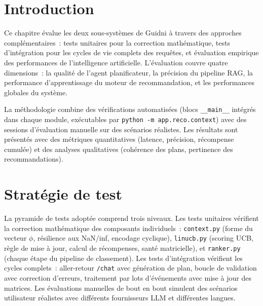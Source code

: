 
\section{Introduction}

Ce chapitre évalue les deux sous-systèmes de Guidni à travers des approches complémentaires~:
tests unitaires pour la correction mathématique, tests d'intégration pour les cycles de vie
complets des requêtes, et évaluation empirique des performances de l'intelligence artificielle.
L'évaluation couvre quatre dimensions~: la qualité de l'agent planificateur, la précision du
pipeline RAG, la performance d'apprentissage du moteur de recommandation, et les performances
globales du système.

La méthodologie combine des vérifications automatisées (blocs \texttt{\_\_main\_\_} intégrés
dans chaque module, exécutables par \texttt{python -m app.reco.context}) avec des sessions
d'évaluation manuelle sur des scénarios réalistes. Les résultats sont présentés avec des
métriques quantitatives (latence, précision, récompense cumulée) et des analyses qualitatives
(cohérence des plans, pertinence des recommandations).


\section{Stratégie de test}

La pyramide de tests adoptée comprend trois niveaux. Les tests unitaires vérifient la
correction mathématique des composants individuels~: \texttt{context.py} (forme du vecteur
$\phi$, résilience aux NaN/inf, encodage cyclique), \texttt{linucb.py} (scoring UCB,
règle de mise à jour, calcul de récompenses, santé matricielle), et \texttt{ranker.py}
(chaque étape du pipeline de classement). Les tests d'intégration vérifient les cycles
complets~: aller-retour \texttt{/chat} avec génération de plan, boucle de validation avec
correction d'erreurs, traitement par lots d'événements avec mise à jour des matrices. Les
évaluations manuelles de bout en bout simulent des scénarios utilisateur réalistes avec
différents fournisseurs LLM et différentes langues.

